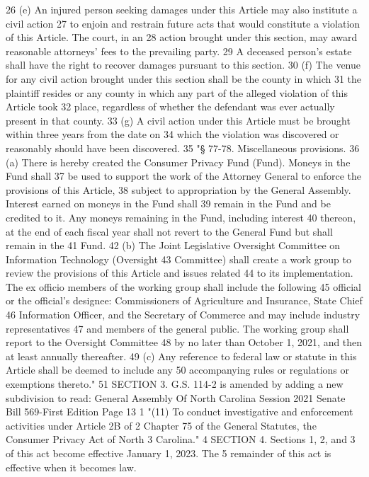 26 (e) An injured person seeking damages under this Article may also institute a civil action
27 to enjoin and restrain future acts that would constitute a violation of this Article. The court, in an
28 action brought under this section, may award reasonable attorneys' fees to the prevailing party.
29 A deceased person's estate shall have the right to recover damages pursuant to this section.
30 (f) The venue for any civil action brought under this section shall be the county in which
31 the plaintiff resides or any county in which any part of the alleged violation of this Article took
32 place, regardless of whether the defendant was ever actually present in that county.
33 (g) A civil action under this Article must be brought within three years from the date on
34 which the violation was discovered or reasonably should have been discovered.
35 "§ 77-78. Miscellaneous provisions.
36 (a) There is hereby created the Consumer Privacy Fund (Fund). Moneys in the Fund shall
37 be used to support the work of the Attorney General to enforce the provisions of this Article,
38 subject to appropriation by the General Assembly. Interest earned on moneys in the Fund shall
39 remain in the Fund and be credited to it. Any moneys remaining in the Fund, including interest
40 thereon, at the end of each fiscal year shall not revert to the General Fund but shall remain in the
41 Fund.
42 (b) The Joint Legislative Oversight Committee on Information Technology (Oversight
43 Committee) shall create a work group to review the provisions of this Article and issues related
44 to its implementation. The ex officio members of the working group shall include the following
45 official or the official's designee: Commissioners of Agriculture and Insurance, State Chief
46 Information Officer, and the Secretary of Commerce and may include industry representatives
47 and members of the general public. The working group shall report to the Oversight Committee
48 by no later than October 1, 2021, and then at least annually thereafter.
49 (c) Any reference to federal law or statute in this Article shall be deemed to include any
50 accompanying rules or regulations or exemptions thereto."
51 SECTION 3. G.S. 114-2 is amended by adding a new subdivision to read:
General Assembly Of North Carolina Session 2021
Senate Bill 569-First Edition Page 13
1 "(11) To conduct investigative and enforcement activities under Article 2B of
2 Chapter 75 of the General Statutes, the Consumer Privacy Act of North
3 Carolina."
4 SECTION 4. Sections 1, 2, and 3 of this act become effective January 1, 2023. The
5 remainder of this act is effective when it becomes law.